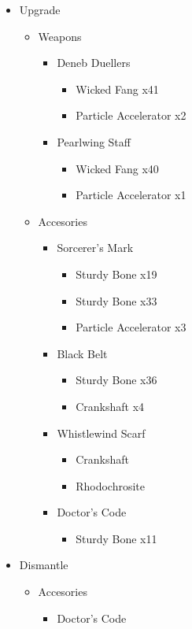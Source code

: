 \begin{upgrade}
	\begin{itemize}
		\item Upgrade
			\begin{itemize}
				\item Weapons
					\begin{itemize}
						\item Deneb Duellers
							\begin{itemize}
								\item Wicked Fang x41
								\item Particle Accelerator x2
							\end{itemize}
						\item Pearlwing Staff
							\begin{itemize}
								\item Wicked Fang x40
								\item Particle Accelerator x1
							\end{itemize}
					\end{itemize}
				\item Accesories
					\begin{itemize}
						\item Sorcerer's Mark
							\begin{itemize}
								\item Sturdy Bone x19
								\item Sturdy Bone x33
								\item Particle Accelerator x3
							\end{itemize}
						\item Black Belt
							\begin{itemize}
								\item Sturdy Bone x36
								\item Crankshaft x4
							\end{itemize}
						\item Whistlewind Scarf
							\begin{itemize}
								\item Crankshaft
								\item Rhodochrosite
							\end{itemize}
						\item Doctor's Code
							\begin{itemize}
								\item Sturdy Bone x11
							\end{itemize}
					\end{itemize}
			\end{itemize}
		\item Dismantle
			\begin{itemize}
				\item Accesories
					\begin{itemize}
						\item Doctor's Code
					\end{itemize}
			\end{itemize}
	\end{itemize}
\end{upgrade}

